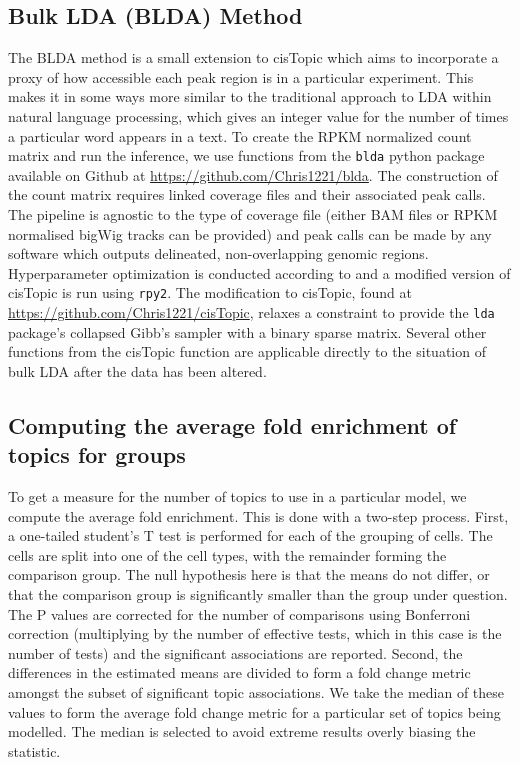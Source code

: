 \subsection{Bulk LDA (BLDA) Method} \label{ch4:method_blda}

The BLDA method is a small extension to cisTopic which aims to incorporate a proxy of how accessible each peak region is in a particular experiment. This makes it in some ways more similar to the traditional approach to LDA within natural language processing, which gives an integer value for the number of times a particular word appears in a text. To create the RPKM normalized count matrix and run the inference, we use functions from the {\tt blda} python package available on Github at \url{https://github.com/Chris1221/blda}. The construction of the count matrix requires linked coverage files and their associated peak calls. The pipeline is agnostic to the type of coverage file (either BAM files or RPKM normalised bigWig tracks can be provided) and peak calls can be made by any software which outputs delineated, non-overlapping genomic regions. Hyperparameter optimization is conducted according to  and a modified version of cisTopic is run using {\tt rpy2}. The modification to cisTopic, found at \url{https://github.com/Chris1221/cisTopic}, relaxes a constraint to provide the {\tt lda} package's collapsed Gibb's sampler with a binary sparse matrix. Several other functions from the cisTopic function are applicable directly to the situation of bulk LDA after the data has been altered. 

\subsection{Computing the average fold enrichment of topics for groups} \label{methods:average_fc}

To get a measure for the number of topics to use in a particular model, we compute the average fold enrichment. This is done with a two-step process. First, a one-tailed student's T test is performed for each of the grouping of cells. The cells are split into one of the cell types, with the remainder forming the comparison group. The null hypothesis here is that the means do not differ, or that the comparison group is significantly smaller than the group under question. The P values are corrected for the number of comparisons using Bonferroni correction (multiplying by the number of effective tests, which in this case is the number of tests) and the significant associations are reported. Second, the differences in the estimated means are divided to form a fold change metric amongst the subset of significant topic associations. We take the median of these values to form the average fold change metric for a particular set of topics being modelled. The median is selected to avoid extreme results overly biasing the statistic.

